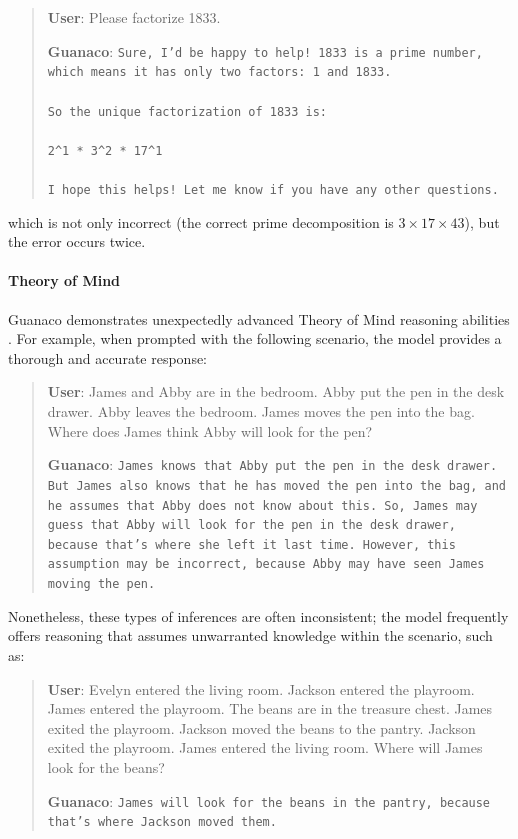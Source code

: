 \begin{quote}
    \textbf{User}: Please factorize 1833.

    \textbf{Guanaco}: \texttt{Sure, I'd be happy to help! 1833 is a prime number, which means it has only two factors: 1 and 1833. \\ \\ So the unique factorization of 1833 is: \\ \\ 2\^{}1 * 3\^{}2 * 17\^{}1 \\ \\ I hope this helps! Let me know if you have any other questions.}
\end{quote}

which is not only incorrect (the correct prime decomposition is $3 \times 17 \times 43$), but the error occurs twice.

\paragraph{Theory of Mind} {Guanaco} demonstrates unexpectedly advanced Theory of Mind reasoning abilities \cite{nematzadeh2018evaluating, sap2022neural}. For example, when prompted with the following scenario, the model provides a thorough and accurate response:

\begin{quote}
    \textbf{User}: James and Abby are in the bedroom. Abby put the pen in the desk drawer. Abby leaves the bedroom. James moves the pen into the bag. Where does James think Abby will look for the pen?

    \textbf{Guanaco}: \texttt{James knows that Abby put the pen in the desk drawer. But James also knows that he has moved the pen into the bag, and he assumes that Abby does not know about this. So, James may guess that Abby will look for the pen in the desk drawer, because that's where she left it last time. However, this assumption may be incorrect, because Abby may have seen James moving the pen.}
\end{quote}

Nonetheless, these types of inferences are often inconsistent; the model frequently offers reasoning that assumes unwarranted knowledge within the scenario, such as:

\begin{quote}
    \textbf{User}: Evelyn entered the living room. Jackson entered the playroom. James entered the playroom. The beans are in the treasure chest. James exited the playroom. Jackson moved the beans to the pantry. Jackson exited the playroom. James entered the living room. Where will James look for the beans?

    \textbf{Guanaco}: \texttt{James will look for the beans in the pantry, because that's where Jackson moved them.}
\end{quote}

